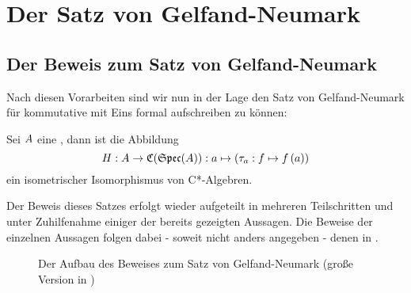 \section{Der Satz von Gelfand-Neumark}\label{sec:GN}









\subsection{Der Beweis zum Satz von Gelfand-Neumark}

Nach diesen Vorarbeiten sind wir nun in der Lage den Satz von Gelfand-Neumark für kommutative \CAlgn{} mit Eins formal aufschreiben zu können: 

\begin{satz}\label{satz:GN}
Sei $A$ eine \CAlg, dann ist die Abbildung
\[H: A \to \mathfrak{C}(\mathfrak{Spec}(A)): a \mapsto \left(\tau_a: f \mapsto f\left(a\right)\right)\]
ein isometrischer Isomorphismus von C*-Algebren.
\end{satz}

Der Beweis dieses Satzes erfolgt wieder aufgeteilt in mehreren Teilschritten und unter Zuhilfenahme einiger der bereits gezeigten Aussagen. Die Beweise der einzelnen Aussagen folgen dabei - soweit nicht anders angegeben - denen in \cite[S. 49-69]{Baer2003}.
\begin{figure}[h]
\begin{tiny}
	
\end{tiny}
	\caption{Der Aufbau des Beweises zum Satz von Gelfand-Neumark (große Version in )}
\end{figure}







